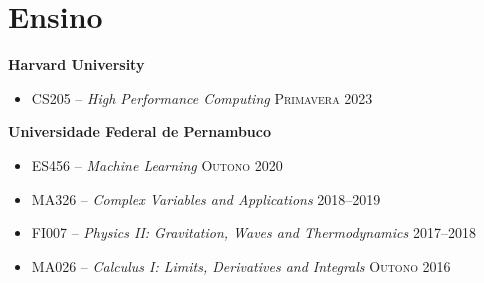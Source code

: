 \documentclass[letterpaper,10pt]{article}
\newcommand{\entry}[4]{

\begin{minipage}[t]{.15\textwidth}
\end{minipage}
\hfill\vline\hfill 
\begin{minipage}[t]{0.95\textwidth}
#2 \hfill \textsc{#1}

\textit{#3}

\footnotesize{#4}
\end{minipage}\\\vspace{.25cm}}
\newcommand{\harv}{Harvard University}
\newcommand{\ufpe}{Universidade Federal de Pernambuco}
\newcommand{\mycomment}[1]{}
\begin{document}
\vspace*{-.25cm}
\newpage
\section{Ensino}
\textbf{\harv}
\vspace{-0.5em}
\begin{itemize}[label={}]
    \setlength\itemsep{0.1em}
    \item CS205 -- \textit{High Performance Computing} \hfill\textsc{Primavera 2023}
\end{itemize}
\vspace*{-.1cm}
\hspace{1.5em}\textbf{\ufpe} 
\vspace{-0.5em}
\begin{itemize}[label={}]
    \setlength\itemsep{0.1em}
    \item ES456 -- \textit{Machine Learning} \hfill\textsc{Outono 2020}
    \item MA326 -- \textit{Complex Variables and Applications} \hfill\textsc{2018--2019}
    \item FI007 -- \textit{Physics II: Gravitation, Waves and Thermodynamics} \hfill\textsc{2017--2018}
    \item MA026 -- \textit{Calculus I: Limits, Derivatives and Integrals} \hfill\textsc{Outono 2016} 
\end{itemize}
\vspace*{-.25cm}
\mycomment{
\entry{Spring 2023}{CS205 -- \textbf{High Performance Computing} -- Teaching Fellow}{\harv}{
	I led lab activites, held office hours, assisted the teaching staff on grading assignments, and mentored some of the final projects.
	}

\entry{Fall 2020}{ES456 -- \textbf{Machine Learning} -- Teaching Assistant}{\ufpe}{
	I conducted my own activities and lectures off of my own syllabus. Supported the students developing projects and graded work.
	}

\entry{2018--2019}{MA326 -- \textbf{Complex Variables and Applications} -- Teaching Assistant}{\ufpe}{
	I taught once-a-week sessions to support students in their assignments.
	}

\entry{2017--2018}{FI007 -- \textbf{Physics II: Gravitation, Waves and Thermodynamics} -- Teaching Assistant}{\ufpe}{
	I wrote some extra assignments for students interested in Olympic-level Physics, as well as once-a-week sessions to discuss.
	}

\entry{Fall 2016}{MA026 -- \textbf{Calculus I: Limits, Derivatives and Integrals} -- Teaching Assistant}{\ufpe}{
	I taught once-a-week sessions to support students in their assignments.
	}
}
\end{document}
